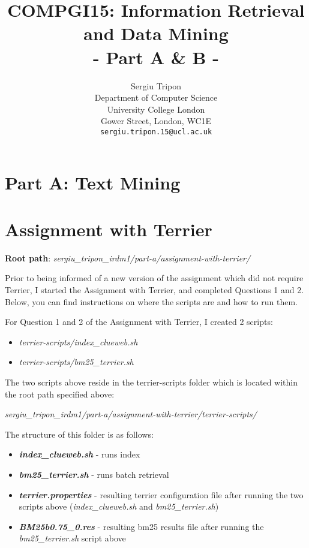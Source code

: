 \documentclass{article} %
\title{COMPGI15: Information Retrieval and Data Mining\\- Part A \& B -}
\author{
Sergiu Tripon\\
Department of Computer Science\\
University College London\\
Gower Street, London, WC1E\\
\texttt{sergiu.tripon.15@ucl.ac.uk}\\
}
\begin{document}
\maketitle

\section*{Part A: Text Mining}

\section*{Assignment with Terrier}

\textbf{Root path}: \textit{sergiu\_tripon\_irdm1/part-a/assignment-with-terrier/}

Prior to being informed of a new version of the assignment which did not require Terrier, I started the Assignment with Terrier, and completed Questions 1 and 2. Below, you can find instructions on where the scripts are and how to run them.

For Question 1 and 2 of the Assignment with Terrier, I created 2 scripts:

\begin{itemize}
    \item \textit{terrier-scripts/index\_clueweb.sh}
    \item \textit{terrier-scripts/bm25\_terrier.sh}
\end{itemize}

The two scripts above reside in the terrier-scripts folder which is located within the root path specified above:

\textit{sergiu\_tripon\_irdm1/part-a/assignment-with-terrier/terrier-scripts/}

The structure of this folder is as follows:

\begin{itemize}
    \item \textit{\textbf{index\_clueweb.sh}} - runs index
    \item \textit{\textbf{bm25\_terrier.sh}} - runs batch retrieval
    \item \textit{\textbf{terrier.properties}} - resulting terrier configuration file after running the two scripts above (\textit{index\_clueweb.sh} and \textit{bm25\_terrier.sh})
    \item \textit{\textbf{BM25b0.75\_0.res}} - resulting bm25 results file after running the \textit{bm25\_terrier.sh} script above
\end{itemize}
\end{document}
